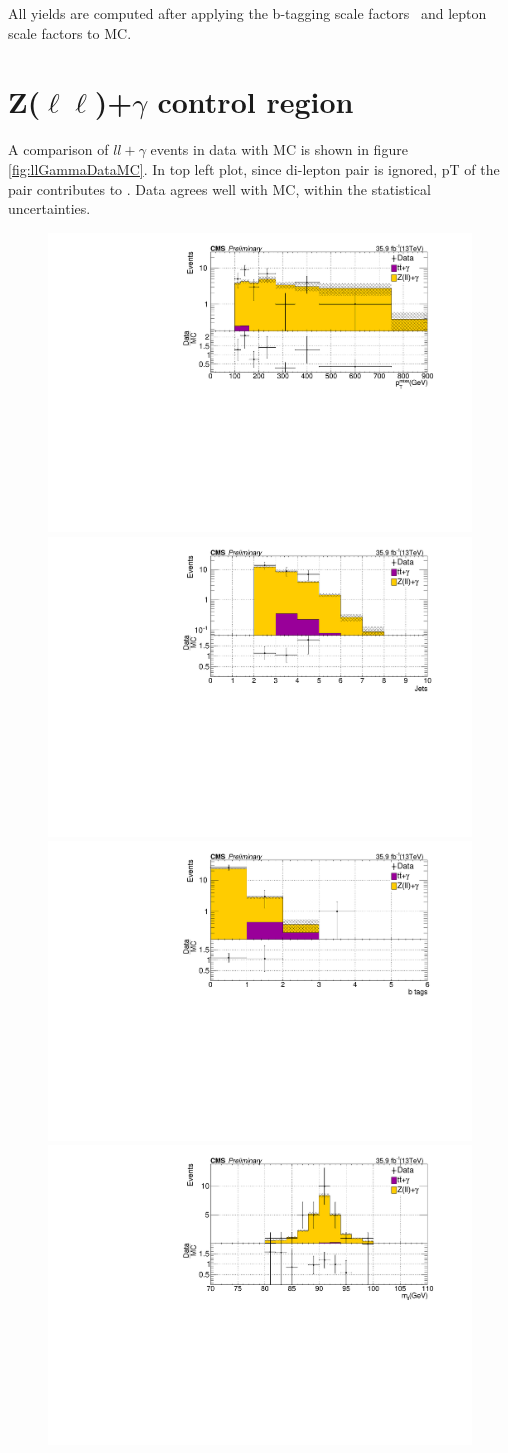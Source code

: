 All yields are computed after applying the b-tagging scale factors~\cite{BTV-16-002} and 
lepton scale factors to MC. 

\section{Z($\ell\ell$)+$\gamma$ control region}
A comparison of $ll+\gamma$ events in data with MC is shown in figure \ref{fig:llGammaDataMC}. In top left plot, since di-lepton pair is ignored, pT of the pair contributes to \ptmiss. Data agrees well with MC, within the statistical uncertainties.
\begin{figure}[h!]
\centering
\includegraphics[width=0.48\linewidth]{../Figures/Chap3/zgamma/METvarBin_LLGDataMC.pdf}
\includegraphics[width=0.48\linewidth]{../Figures/Chap3/zgamma/nHadJets_LLGDataMC.pdf}\\
\includegraphics[width=0.48\linewidth]{../Figures/Chap3/zgamma/nBTags_LLGDataMC.pdf}
\includegraphics[width=0.48\linewidth]{../Figures/Chap3/zgamma/ZMass_LLGDataMC.pdf}

\end{figure}
